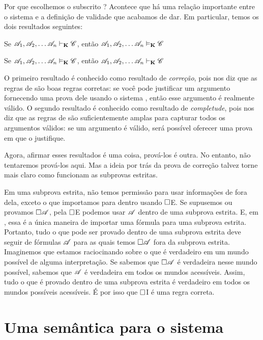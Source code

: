 Por que escolhemos o subscrito \mlK? Acontece que há uma relação importante entre o sistema \mlK{} e a definição de validade que acabamos de dar. Em particular, temos os dois resultados seguintes:
\begin{compactlist}
\item Se $\mathscr{A}_1,\mathscr{A}_2, \dots \mathscr{A}_n\vdash_{\mathbf{K}}\mathscr{C}$, então $\mathscr{A}_1,\mathscr{A}_2, \dots \mathscr{A}_n\vDash_{\mathbf{K}}\mathscr{C}$
\item Se $\mathscr{A}_1,\mathscr{A}_2, \dots \mathscr{A}_n\vDash_{\mathbf{K}}\mathscr{C}$, então $\mathscr{A}_1,\mathscr{A}_2, \dots \mathscr{A}_n\vdash_{\mathbf{K}}\mathscr{C}$
\end{compactlist}
O primeiro resultado é conhecido como resultado de \emph{correção}, pois nos diz que as regras de \mlK{} são boas regras corretas: se você pode justificar um argumento fornecendo uma prova dele usando o sistema \mlK, então esse argumento é realmente válido. O segundo resultado é conhecido como resultado de \emph{completude}, pois nos diz que as regras de \mlK{} são suficientemente amplas para capturar todos os argumentos válidos: se um argumento é válido, será possível oferecer uma prova em \mlK{} que o justifique.

Agora, afirmar esses resultados é uma coisa, prová-los é outra. No entanto, não tentaremos prová-los aqui. Mas a ideia por trás da prova de correção talvez torne mais claro como funcionam as subprovas estritas.

Em uma subprova estrita, não temos permissão para usar informações de fora dela, exceto o que importamos para dentro usando $\Box$E. Se supusemos ou provamos $\Box \mathscr{A}$, pela $\Box$E podemos usar $\mathscr{A}$ dentro de uma subprova estrita. E, em \mlK, essa é a única maneira de importar uma fórmula para uma subprova estrita. Portanto, tudo o que pode ser provado dentro de uma subprova estrita deve seguir de fórmulas $\mathscr{A}$ para as quais temos $\Box \mathscr{A}$ fora da subprova estrita. Imaginemos que estamos raciocinando sobre o que é verdadeiro em um mundo possível de alguma interpretação. Se sabemos que $\Box\mathscr{A}$ é verdadeira nesse mundo possível, sabemos que $\mathscr{A}$ é verdadeira em todos os mundos acessíveis. Assim, tudo o que é provado dentro de uma subprova estrita é verdadeiro em todos os mundos possíveis acessíveis. É por isso que $\Box$I é uma regra correta.

\section{Uma semântica para o sistema \mlT}
\label{SemanticsT}

